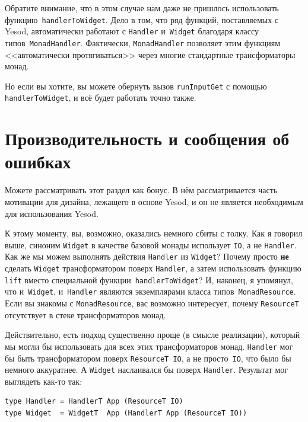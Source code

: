 
Обратите внимание, что в этом случае нам даже не пришлось использовать
функцию~\lstinline'handlerToWidget'. Дело в том, что ряд функций, поставляемых
с Yesod, автоматически работают с \lstinline'Handler' и~\lstinline'Widget'
благодаря классу типов~\lstinline'MonadHandler'. Фактически,
\lstinline'MonadHandler' позволяет этим функциям <<автоматически
протягиваться>> через многие стандартные трансформаторы монад.

Но если вы хотите, вы можете обернуть вызов \lstinline'runInputGet' с помощью
\lstinline'handlerToWidget', и всё будет работать точно также.

\section{Производительность и сообщения об ошибках}
\begin{remark}
    Можете рассматривать этот раздел как бонус. В нём рассматривается часть
    мотивации для дизайна, лежащего в основе Yesod, и он не является
    необходимым для использования Yesod.
\end{remark}

К этому моменту, вы, возможно, оказались немного сбиты с толку. Как я говорил
выше, синоним \lstinline'Widget' в качестве базовой
монады использует \lstinline'IO', а не \lstinline'Handler'. Как же мы можем
выполнять действия \lstinline'Handler' из \lstinline'Widget'? Почему просто 
\textbf{не} сделать \lstinline'Widget' трансформатором поверх
\lstinline'Handler', а затем использовать функцию \lstinline'lift' вместо
специальной функции~\lstinline'handlerToWidget'? И, наконец, я упомянул, что
и~\lstinline'Widget', и~\lstinline'Handler' являются экземплярами класса
типов~\lstinline'MonadResource'. Если вы знакомы с \lstinline'MonadResource',
вас возможно интересует, почему \lstinline'ResourceT' отсутствует в стеке
трансформаторов монад.

Действительно, есть подход существенно проще (в смысле реализации), который мы
могли бы использовать для всех этих трансформаторов монад. \lstinline'Handler'
мог бы быть трансформатором поверх \lstinline'ResourceT IO', а не
просто~\lstinline'IO', что было бы немного аккуратнее. А \lstinline'Widget'
наслаивался бы поверх \lstinline'Handler'. Результат мог выглядеть как-то так:
\begin{lstlisting}
type Handler = HandlerT App (ResourceT IO)
type Widget  = WidgetT  App (HandlerT App (ResourceT IO))
\end{lstlisting}

